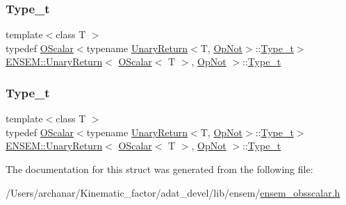 \subsubsection{\texorpdfstring{Type\_t}{Type\_t}\hspace{0.1cm}{\footnotesize\ttfamily [1/2]}}
{\footnotesize\ttfamily template$<$class T $>$ \\
typedef \mbox{\hyperlink{classENSEM_1_1OScalar}{O\+Scalar}}$<$typename \mbox{\hyperlink{structENSEM_1_1UnaryReturn}{Unary\+Return}}$<$T, \mbox{\hyperlink{structENSEM_1_1OpNot}{Op\+Not}}$>$\+::\mbox{\hyperlink{structENSEM_1_1UnaryReturn_3_01OScalar_3_01T_01_4_00_01OpNot_01_4_a0a3874d32de1d033bfe55bfd921d73be}{Type\+\_\+t}}$>$ \mbox{\hyperlink{structENSEM_1_1UnaryReturn}{E\+N\+S\+E\+M\+::\+Unary\+Return}}$<$ \mbox{\hyperlink{classENSEM_1_1OScalar}{O\+Scalar}}$<$ T $>$, \mbox{\hyperlink{structENSEM_1_1OpNot}{Op\+Not}} $>$\+::\mbox{\hyperlink{structENSEM_1_1UnaryReturn_3_01OScalar_3_01T_01_4_00_01OpNot_01_4_a0a3874d32de1d033bfe55bfd921d73be}{Type\+\_\+t}}}

\mbox{\label{structENSEM_1_1UnaryReturn_3_01OScalar_3_01T_01_4_00_01OpNot_01_4_a0a3874d32de1d033bfe55bfd921d73be}} 
\subsubsection{\texorpdfstring{Type\_t}{Type\_t}\hspace{0.1cm}{\footnotesize\ttfamily [2/2]}}
{\footnotesize\ttfamily template$<$class T $>$ \\
typedef \mbox{\hyperlink{classENSEM_1_1OScalar}{O\+Scalar}}$<$typename \mbox{\hyperlink{structENSEM_1_1UnaryReturn}{Unary\+Return}}$<$T, \mbox{\hyperlink{structENSEM_1_1OpNot}{Op\+Not}}$>$\+::\mbox{\hyperlink{structENSEM_1_1UnaryReturn_3_01OScalar_3_01T_01_4_00_01OpNot_01_4_a0a3874d32de1d033bfe55bfd921d73be}{Type\+\_\+t}}$>$ \mbox{\hyperlink{structENSEM_1_1UnaryReturn}{E\+N\+S\+E\+M\+::\+Unary\+Return}}$<$ \mbox{\hyperlink{classENSEM_1_1OScalar}{O\+Scalar}}$<$ T $>$, \mbox{\hyperlink{structENSEM_1_1OpNot}{Op\+Not}} $>$\+::\mbox{\hyperlink{structENSEM_1_1UnaryReturn_3_01OScalar_3_01T_01_4_00_01OpNot_01_4_a0a3874d32de1d033bfe55bfd921d73be}{Type\+\_\+t}}}



The documentation for this struct was generated from the following file\+:\begin{DoxyCompactItemize}
\item 
/\+Users/archanar/\+Kinematic\+\_\+factor/adat\+\_\+devel/lib/ensem/\mbox{\hyperlink{lib_2ensem_2ensem__obsscalar_8h}{ensem\+\_\+obsscalar.\+h}}\end{DoxyCompactItemize}
